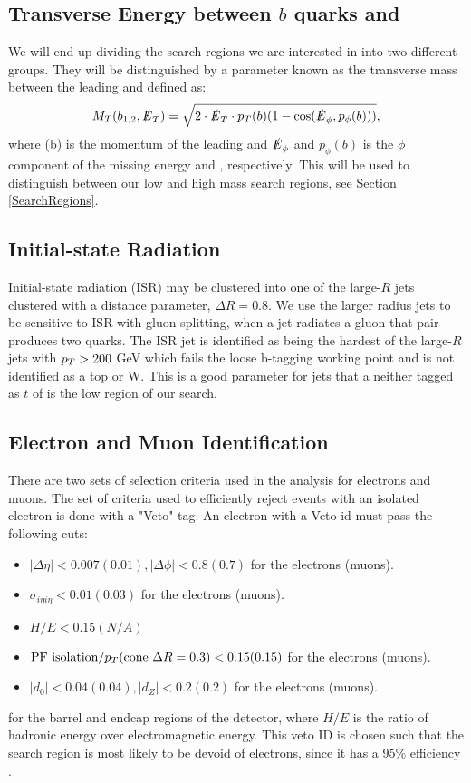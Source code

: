 \subsection{Transverse Energy between $b$ quarks and \met}
We will end up dividing the search regions we are interested in into two different groups. They will be distinguished by a parameter known as the transverse mass between the leading \bjet{} and \met{} defined as:
\begin{equation}\label{TransverseMass}
M_{T}(b_{1,2},\slashed{E}_{T})=\sqrt{2\cdot\slashed{E}_{T}\cdot p_{T}(b)(1-\cos(\slashed{E}_\phi,p_{\phi}(b)))},
\end{equation}
where \pt(b) is the momentum of the leading \bjet{} and $\slashed{E}_\phi$ and $p_{\phi}(b)$ is the $\phi$ component of the missing energy and \bjet{}, respectively. This will be used to distinguish between our low and high mass search regions, see Section \ref{SearchRegions}.


\subsection{Initial-state Radiation}\label{ISRpt}

Initial-state radiation (ISR) may be clustered into one of the large-$R$ jets clustered with a distance parameter, $\Delta R=0.8$. We use the larger radius jets to be sensitive to ISR with gluon splitting, when a jet radiates a gluon that pair produces two quarks. The ISR jet is identified as being the hardest of the large-$R$ jets with $p_{T}>200$ GeV which fails the loose b-tagging working point and is not identified as a top or W. This is a good parameter for jets that a neither tagged as $t$ of \W{} is the low \dm{} region of our search.
 
 \subsection{Electron and Muon Identification}\label{EleMuonID}
 There are two sets of selection criteria used in the analysis for electrons and muons. The set of criteria used to efficiently reject events with an isolated electron is done with a "Veto" tag. An electron with a Veto id must pass the following cuts:
 \begin{itemize}
	 \item $|\Delta\eta|<0.007(0.01),|\Delta\phi|<0.8(0.7)$ for the electrons (muons).
	 \item $\sigma_{i\eta i\eta}<0.01(0.03)$ for the electrons (muons).
	 \item $H/E<0.15(N/A)$
	 \item $\text{PF isolation}/p_{T}(\text{cone } \Delta R=0.3)<0.15(0.15)$ for the electrons (muons).
	 \item $|d_{0}|<0.04(0.04),|d_Z|<0.2(0.2)$ for the electrons (muons).
 \end{itemize}
 for the barrel and endcap regions of the detector, where $H/E$ is the ratio of hadronic energy over electromagnetic energy. This veto ID is chosen such that the search region is most likely to be devoid of electrons, since it has a 95\% efficiency \cite{noauthor_egammapublicdata_nodate}.
 
